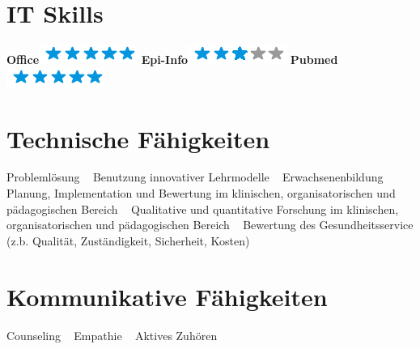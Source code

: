 \documentclass[11pt]{friggeri-cv}
\begin{document}
%
%
\vspace{-10pt}
\begin{aside}
  \section{IT Skills}
  \textbf{Office}\includegraphics[scale=0.40]{img/5stars.png}
  \textbf{Epi-Info}\includegraphics[scale=0.40]{img/3stars.png}
  \textbf{Pubmed}\includegraphics[scale=0.40]{img/5stars.png}
  \section{Technische F\"{a}higkeiten}\vspace{5pt}\footnotesize{
    Probleml\"{o}sung
    ~
    Benutzung innovativer Lehrmodelle
    ~
    Erwachsenenbildung
    ~
    Planung, Implementation und Bewertung im klinischen, organisatorischen und p\"{a}dagogischen Bereich 
    ~
    Qualitative und quantitative Forschung im klinischen, organisatorischen und p\"{a}dagogischen Bereich
    ~
    Bewertung des Gesundheitsservice (z.b. Qualit\"{a}t, Zust\"{a}ndigkeit, Sicherheit, Kosten)}
  \section{Kommunikative F\"{a}higkeiten}\vspace{5pt}\footnotesize{
    Counseling
    ~
    Empathie
    ~
    Aktives Zuh\"{o}ren}
\end{aside}

\vspace{-20pt}
\end{document}

